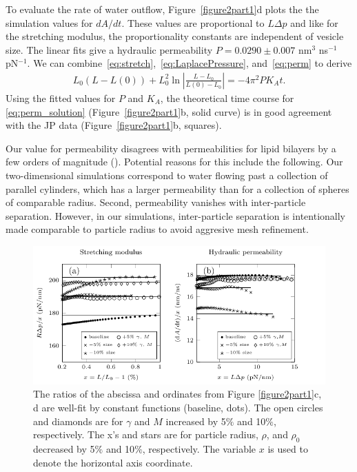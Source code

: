 \documentclass[lineno]{jfm}
\begin{document}
To evaluate the rate of water outflow, 
Figure~\ref{figure2part1}d plots the the simulation values for $dA/dt$.  
These values are proportional to $L\Delta p$ and like for the stretching modulus, 
the proportionality constants are 
independent of vesicle size.
The  linear fits give a hydraulic permeability $P = 0.0290 \pm 0.007$ nm$^3$ ns$^{-1}$ pN$^{-1}$.
We can combine~\eqref{eq:stretch},~\eqref{eq:LaplacePressure},
and~\eqref{eq:perm} to derive
\begin{align}
\label{eq:perm_solution}
L_0(L-L(0)) + L_0^2 \ln\left|\frac{L-L_0}{L(0)-L_0}\right| = -4\pi^2 P K_A t.
\end{align}
Using the fitted values for $P$ and $K_A$, the theoretical time course for 
\eqref{eq:perm_solution} (Figure~\ref{figure2part1}b, solid curve) is in good
agreement with the JP data (Figure~\ref{figure2part1}b, squares).

Our value for permeability disagrees 
with permeabilities for lipid bilayers by a few orders of magnitude  (\cite{chabanon2017, qua-gan-you2021}).
Potential reasons for this include the following. 
Our two-dimensional simulations correspond to water flowing past a collection
of parallel cylinders, which has a larger permeability than for a collection
of spheres of comparable radius.   
Second, permeability vanishes with inter-particle separation.  
However, in our simulations, inter-particle separation is intentionally made comparable to 
particle radius to avoid aggresive mesh refinement.

\begin{figure}
\centering
\includegraphics[width=\textwidth]{Figure2_Wrapper.pdf}
\caption{\label{figure2}  
The ratios of the abscissa and ordinates from Figure \ref{figure2part1}c, d are well-fit by constant functions (baseline, dots).
The open circles and diamonds are for $\gamma$ and $M$ increased by 5$\%$ and 10$\%$, respectively. 
The x's and stars are for particle radius, $\rho$, and $\rho_0$ decreased by 5$\%$ and 10$\%$, respectively.
The variable $x$ is used to denote the horizontal axis coordinate. 
}
\end{figure}
\end{document}
